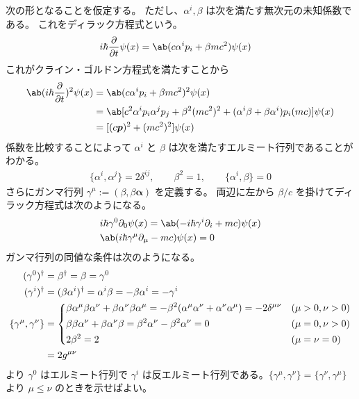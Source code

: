 \documentclass[uplatex,dvipdfmx,a4paper,11pt]{jlreq}
\theoremstyle{definition}
\newcommand{\pp}{\bm{p}}
\numberwithin{equation}{section}
\begin{document}
次の形となることを仮定する。
ただし、$\alpha^i, \beta$ は次を満たす無次元の未知係数である。
これをディラック方程式という。
\begin{align}
  i\hbar\diffp{}{t}\psi(x) & = \ab(c\alpha^ip_i + \beta mc^2)\psi(x)
\end{align}
これがクライン・ゴルドン方程式を満たすことから
\begin{align}
  \ab(i\hbar\diffp{}{t})^2\psi(x) & = \ab(c\alpha^ip_i + \beta mc^2)^2\psi(x)                                                          \\
                                  & = \ab[c^2\alpha^ip_i\alpha^jp_j + \beta^2(mc^2)^2 + (\alpha^i\beta + \beta\alpha^i)p_i(mc)]\psi(x) \\
                                  & = [(c\pp)^2 + (mc^2)^2]\psi(x)
\end{align}
係数を比較することによって $\alpha^i$ と $\beta$ は次を満たすエルミート行列であることがわかる。
\begin{align}
  \lbrace\alpha^i,\alpha^j\rbrace = 2\delta^{ij}, \qquad \beta^2 = 1, \qquad \lbrace\alpha^i,\beta\rbrace = 0 \label{condition}
\end{align}
さらにガンマ行列 $\gamma^\mu := (\beta, \beta\bm{\alpha})$ を定義する。
両辺に左から $\beta/c$ を掛けてディラック方程式は次のようになる。
\begin{align}
   & i\hbar\gamma^0\partial_0\psi(x) = \ab(-i\hbar\gamma^i\partial_i + mc)\psi(x) \\
   & \ab(i\hbar\gamma^\mu\partial_\mu - mc)\psi(x) = 0
\end{align}
ガンマ行列の同値な条件は次のようになる。
\begin{align}
  (\gamma^0)^\dagger                   & = \beta^\dagger = \beta = \gamma^0                                                                                        \\
  (\gamma^i)^\dagger                   & = (\beta\alpha^i)^\dagger = \alpha^i\beta = -\beta\alpha^i = -\gamma^i                                                    \\
  \lbrace\gamma^\mu, \gamma^\nu\rbrace & =
  \begin{dcases}
    \beta\alpha^\mu\beta\alpha^\nu + \beta\alpha^\nu\beta\alpha^\mu = -\beta^2(\alpha^\mu\alpha^\nu + \alpha^\nu\alpha^\mu) = -2\delta^{\mu\nu} & (\mu > 0, \nu > 0) \\
    \beta\beta\alpha^\nu + \beta\alpha^\nu\beta = \beta^2\alpha^\nu - \beta^2\alpha^\nu = 0                                                     & (\mu = 0, \nu > 0) \\
    2\beta^2 = 2                                                                                                                                & (\mu = \nu = 0)
  \end{dcases} \\
                                       & = 2g^{\mu\nu}
\end{align}
より $\gamma^0$ はエルミート行列で $\gamma^i$ は反エルミート行列である。$\lbrace\gamma^\mu, \gamma^\nu\rbrace = \lbrace\gamma^\nu, \gamma^\mu\rbrace$ より $\mu \leq \nu$ のときを示せばよい。
\end{document}
